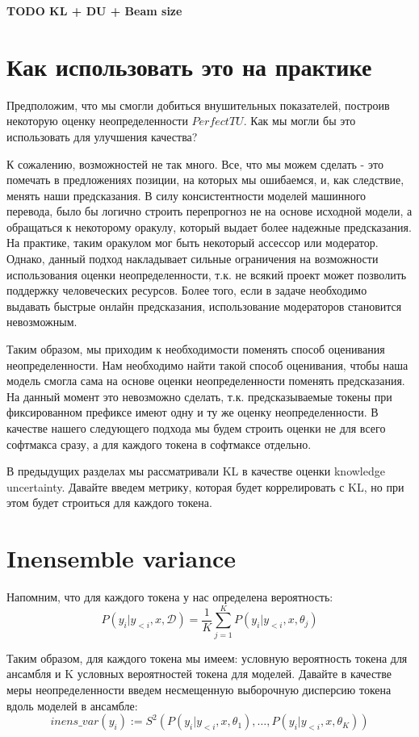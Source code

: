 \documentclass[a4paper,14pt]{extarticle}
\begin{document}
	\textbf{TODO KL + DU + Beam size}
	
\section{Как использовать это на практике}
	Предположим, что мы смогли добиться внушительных показателей, построив некоторую оценку неопределенности $PerfectTU$. Как мы могли бы это использовать для улучшения качества?
	
	К сожалению, возможностей не так много. Все, что мы можем сделать - это помечать в предложениях позиции, на которых мы ошибаемся, и, как следствие, менять наши предсказания. В силу консистентности моделей машинного перевода, было бы логично строить перепрогноз не на основе исходной модели, а обращаться к некоторому оракулу, который выдает более надежные предсказания. На практике, таким оракулом мог быть некоторый ассессор или модератор. Однако, данный подход накладывает сильные ограничения на возможности использования оценки неопределенности, т.к. не всякий проект может позволить поддержку человеческих ресурсов. Более того, если в задаче необходимо выдавать быстрые онлайн предсказания, использование модераторов становится невозможным.
	
	Таким образом, мы приходим к необходимости поменять способ оценивания неопределенности. Нам необходимо найти такой способ оценивания, чтобы наша модель смогла сама на основе оценки неопределенности поменять предсказания. На данный момент это невозможно сделать, т.к. предсказываемые токены при фиксированном префиксе имеют одну и ту же оценку неопределенности. В качестве нашего следующего подхода мы будем строить оценки не для всего софтмакса сразу, а для каждого токена в софтмаксе отдельно.
	
	В предыдущих разделах мы рассматривали KL в качестве оценки knowledge uncertainty. Давайте введем метрику, которая будет коррелировать с KL, но при этом будет строиться для каждого токена.

\section{Inensemble variance}
	Напомним, что для каждого токена у нас определена вероятность:
	\begin{equation*}
		P(y_i | y_{<i}, x, \mathcal{D}) = \frac1{K} \sum_{j=1}^{K}P(y_i | y_{<i}, x, \theta_j)
	\end{equation*}
	
	Таким образом, для каждого токена мы имеем: условную вероятность токена для ансамбля и K условных вероятностей токена для моделей. Давайте в качестве меры неопределенности введем несмещенную выборочную дисперсию токена вдоль моделей в ансамбле:
	\begin{equation}
		inens\_var(y_i) := S^2(P(y_i | y_{<i}, x, \theta_1), \dots, P(y_i | y_{<i}, x, \theta_K))
	\end{equation}
	
\end{document}

